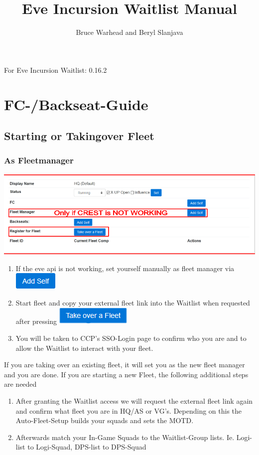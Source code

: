 \documentclass[oneside,a4paper]{article}
\title{Eve Incursion Waitlist Manual}
\author{Bruce Warhead and Beryl Slanjava}
\newcommand{\wlversion}{0.16.2}
\newcommand{\guidefor}{For Eve Incursion Waitlist: \wlversion\xspace}
\begin{document}
\maketitle
\begin{center}
\guidefor
\end{center}


\tableofcontents

\newpage


\section{FC-/Backseat-Guide}
\subsection{Starting or Takingover Fleet}
\subsubsection{As Fleetmanager}
\includegraphics[width=\textwidth]{takeover-fleetmanager.png}
\begin{enumerate}
	\item If the eve api is not working, set yourself manually as fleet manager via \includegraphics[scale=0.5]{add-self.png}
	\item Start fleet and copy your external fleet link into the Waitlist when requested after pressing \includegraphics[scale=0.5]{take-over-fleet.png}
	\item  You will be taken to CCP's SSO-Login page to confirm who you are and to allow the Waitlist to interact with your fleet.
\end{enumerate}
If you are taking over an existing fleet, it will set you as the new fleet manager and you are done.
If you are starting a new Fleet, the following additional steps are needed
\begin{enumerate}
	\item After granting the Waitlist access we will request the external fleet link again and confirm what fleet you are in HQ/AS or VG’s. Depending on this the Auto-Fleet-Setup builds your squads and sets the MOTD.	
	\item Afterwards match your In-Game Squads to the Waitlist-Group lists. Ie. Logi-list to Logi-Squad, DPS-list to DPS-Squad
\end{enumerate}
\end{document}
